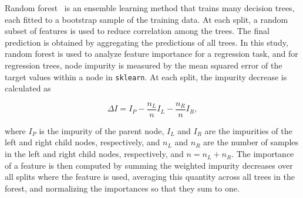Random forest~\cite{breiman2001random} is an ensemble learning method that trains many decision trees, each fitted to a bootstrap sample of the training data. At each split, a random subset of features is used to reduce correlation among the trees. The final prediction is obtained by aggregating the predictions of all trees. In this study, random forest is used to analyze feature importance for a regression task, and for regression trees, node impurity is measured by the mean squared error of the target values within a node in \texttt{sklearn}. At each split, the impurity decrease is calculated as

\begin{equation}
	\Delta I = I_P - \frac{n_L}{n}I_L - \frac{n_R}{n}I_R,
\end{equation}

where \(I_P\) is the impurity of the parent node, \(I_L\) and \(I_R\) are the impurities of the left and right child nodes, respectively, and \(n_L\) and \(n_R\) are the number of samples in the left and right child nodes, respectively, and \(n = n_L + n_R\). The importance of a feature is then computed by summing the weighted impurity decreases over all splits where the feature is used, averaging this quantity across all trees in the forest, and normalizing the importances so that they sum to one.

